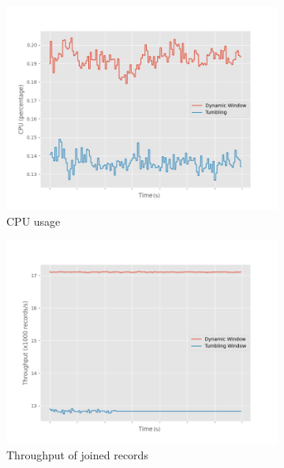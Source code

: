 \begin{figure}
    \begin{subfigure}[b]{0.5\columnwidth}
        \includegraphics[width=\columnwidth]{fig/constant-rate/cpu_comparison.png}
        \caption{CPU usage}
        \label{fig:constant_cpu}
    \end{subfigure}
    \hfill 
    \begin{subfigure}[b]{0.5\columnwidth}
        \includegraphics[width=\columnwidth]{fig/constant-rate/throughput_comparison.png}
        \caption{Throughput of joined records}
        \label{fig:constant_thorughput}
    \end{subfigure}
    \begin{subfigure}[b]{0.5\columnwidth}

\end{subfigure}
\end{figure}
